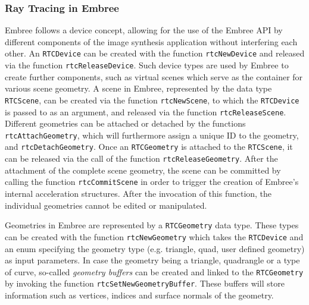 \subsubsection{Ray Tracing in Embree}
\label{sec:embree_raytracing}
Embree follows a device concept, allowing for the use of the Embree API by different components of the image synthesis application without interfering each other. An \texttt{RTCDevice} can be created with the function \texttt{rtcNewDevice} and released via the function \texttt{rtcReleaseDevice}. Such device types are used by Embree to create further components, such as virtual scenes which serve as the container for various scene geometry. A scene in Embree, represented by the data type \texttt{RTCScene}, can be created via the function \texttt{rtcNewScene}, to which the \texttt{RTCDevice} is passed to as an argument, and released via the function \texttt{rtcReleaseScene}. Different geometries can be attached or detached by the functions \texttt{rtcAttachGeometry}, which will furthermore assign a unique ID to the geometry, and \texttt{rtcDetachGeometry}. Once an \texttt{RTCGeometry} is attached to the \texttt{RTCScene}, it can be released via the call of the function \texttt{rtcReleaseGeometry}.
After the attachment of the complete scene geometry, the scene can be committed by calling the function \texttt{rtcCommitScene} in order to trigger the creation of Embree's internal acceleration structures. After the invocation of this function, the individual geometries cannot be edited or manipulated.

Geometries in Embree are represented by a \texttt{RTCGeometry} data type. These types can be created with the function \texttt{rtcNewGeometry} which takes the \texttt{RTCDevice} and an enum specifying the geometry type (e.g. triangle, quad, user defined geometry) as input parameters. In case the geometry being a triangle, quadrangle or a type of curve, so-called \emph{geometry buffers} can be created and linked to the \texttt{RTCGeometry} by invoking the function \texttt{rtcSetNewGeometryBuffer}. These buffers will store information such as vertices, indices and surface normals of the geometry.  

